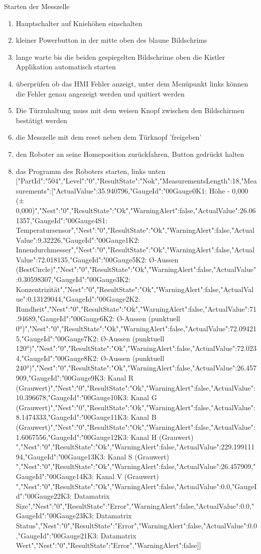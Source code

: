 
Starten der Messzelle
\begin{enumerate}
\item Hauptschalter auf Kniehöhen einschalten
\item kleiner Powerbutton in der mitte oben des blaune Bildschrims
\item lange warte bis die beiden gespiegelten Bildschrime oben die Kistler Applikation automatisch starten
\item überprüfen ob das HMI Fehler anzeigt, unter dem Menüpunkt links können die Fehler genau angezeigt werden und quitiert werden
\item Die Türzuhaltung muss mit dem weisen Knopf zwischen den Bildschirmen bestätigt werden
\item die Messzelle mit dem reset neben dem Türknopf 'freigeben'
\item den Roboter an seine Homeposition zurückfahren, Button gedrückt halten
  \item das Programm des Roboters starten, links unten
[{"PartId":"504","Level":"0","ResultState":"Nok","MeasurementsLength":18,"Measurements":[{"ActualValue":35.940796,"GaugeId":"00Gauge0K1: Höhe - 0,000 (± 0,000)","Nest":"0","ResultState":"Ok","WarningAlert":false},{"ActualValue":26.061357,"GaugeId":"00Gauge4S1: Temperatursensor","Nest":"0","ResultState":"Ok","WarningAlert":false},{"ActualValue":9.32226,"GaugeId":"00Gauge1K2: Innendurchmesser","Nest":"0","ResultState":"Ok","WarningAlert":false},{"ActualValue":72.018135,"GaugeId":"00Gauge5K2: Ø-Aussen (BestCircle)","Nest":"0","ResultState":"Ok","WarningAlert":false},{"ActualValue":0.30598307,"GaugeId":"00Gauge3K2: Konzentrizität","Nest":"0","ResultState":"Ok","WarningAlert":false},{"ActualValue":0.13129044,"GaugeId":"00Gauge2K2: Rundheit","Nest":"0","ResultState":"Ok","WarningAlert":false},{"ActualValue":71.94689,"GaugeId":"00Gauge6K2: Ø-Aussen (punktuell 0°)","Nest":"0","ResultState":"Ok","WarningAlert":false},{"ActualValue":72.094215,"GaugeId":"00Gauge7K2: Ø-Aussen (punktuell 120°)","Nest":"0","ResultState":"Ok","WarningAlert":false},{"ActualValue":72.0234,"GaugeId":"00Gauge8K2: Ø-Aussen (punktuell 240°)","Nest":"0","ResultState":"Ok","WarningAlert":false},{"ActualValue":26.457909,"GaugeId":"00Gauge9K3: Kanal R (Grauwert)","Nest":"0","ResultState":"Ok","WarningAlert":false},{"ActualValue":10.396678,"GaugeId":"00Gauge10K3: Kanal G (Grauwert)","Nest":"0","ResultState":"Ok","WarningAlert":false},{"ActualValue":8.1474333,"GaugeId":"00Gauge11K3: Kanal B (Grauwert)","Nest":"0","ResultState":"Ok","WarningAlert":false},{"ActualValue":1.6067556,"GaugeId":"00Gauge12K3: Kanal H (Grauwert) ","Nest":"0","ResultState":"Ok","WarningAlert":false},{"ActualValue":229.19911194,"GaugeId":"00Gauge13K3: Kanal S (Grauwert) ","Nest":"0","ResultState":"Ok","WarningAlert":false},{"ActualValue":26.457909,"GaugeId":"00Gauge14K3: Kanal V (Grauwert) ","Nest":"0","ResultState":"Ok","WarningAlert":false},{"ActualValue":0.0,"GaugeId":"00Gauge22K3: Datamatrix Size","Nest":"0","ResultState":"Error","WarningAlert":false},{"ActualValue":0.0,"GaugeId":"00Gauge23K3; Datamatrix Status","Nest":"0","ResultState":"Error","WarningAlert":false},{"ActualValue":0.0,"GaugeId":"00Gauge21K3: Datamatrix Wert","Nest":"0","ResultState":"Error","WarningAlert":false}]}]
  

\end{enumerate}
